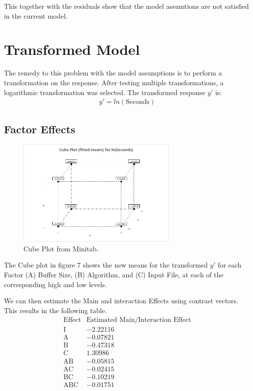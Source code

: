 \documentclass{article}
\begin{document}
  This together with the residuals show that the model assumtions are not satisfied in the current model.

\clearpage
\section{Transformed Model}
The remedy to this problem with the model assumptions is to perform a transformation on the response.
After testing multiple transformations, a logarithmic transformation was selected.
The transformed response $y'$ is:
\begin{align*}
  y' = ln(\text{Seconds})
\end{align*}

\subsection{Factor Effects}
\begin{figure}[h] %
  \centering
  \includegraphics[width=0.7\textwidth]{./images/transformed/cube.png}
  \caption{Cube Plot from Minitab.}
  \label{fig:interaction}
\end{figure}
The Cube plot in figure 7 shows the new means for the transformed $y'$ for each Factor (A) Buffer Size, (B) Algorithm, and (C) Input File, at each of the corresponding high and low levels.

We can then estimate the Main and interaction Effects using contrast vectors. This results in the following table.
\begin{equation*}
  \begin{array}{c|c}
      \text{Effect} & \text{Estimated Main/Interaction Effect} \\
      \hline
      \text{I}   & -2.22116 \\
      \text{A}   & -0.07821 \\
      \text{B}   & -0.47318 \\
      \text{C}   & 1.30986 \\
      \text{AB}  & -0.05815 \\
      \text{AC}  & -0.02415 \\
      \text{BC}  & -0.10219 \\
      \text{ABC} & -0.01751 \\
  
  \end{array}
  \end{equation*}\\
\end{document}
